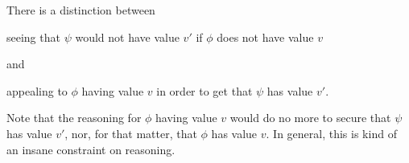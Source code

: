 \begin{note}
  There is a distinction between

  seeing that \(\psi\) would not have value \(v'\) if \(\phi\) does not have value \(v\)

  and

  appealing to \(\phi\) having value \(v\) in order to get that \(\psi\) has value \(v'\).


  Note that the reasoning for \(\phi\) having value \(v\) would do no more to secure that \(\psi\) has value \(v'\), nor, for that matter, that \(\phi\) has value \(v\).
  In general, this is kind of an insane constraint on reasoning.
\end{note}





